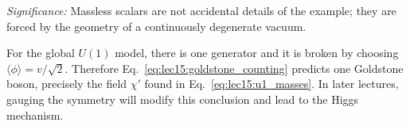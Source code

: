 \textit{Significance:} Massless scalars are not accidental details of the example; they are forced by the geometry of a continuously degenerate vacuum.

For the global $U(1)$ model, there is one generator and it is broken by choosing $\langle\phi\rangle=v/\sqrt2$. Therefore Eq.~\eqref{eq:lec15:goldstone_counting} predicts one Goldstone boson, precisely the field $\chi'$ found in Eq.~\eqref{eq:lec15:u1_masses}. In later lectures, gauging the symmetry will modify this conclusion and lead to the Higgs mechanism.
